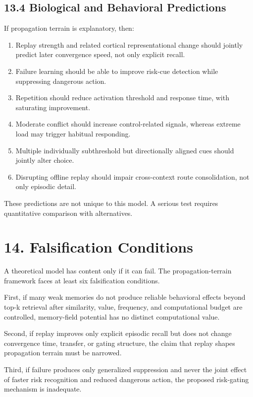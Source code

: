 \documentclass[11pt, a4paper]{article}
\begin{document}
\subsection{13.4 Biological and Behavioral Predictions}

If propagation terrain is explanatory, then:

\begin{enumerate}
\item Replay strength and related cortical representational change should jointly predict later convergence speed, not only explicit recall.
\item Failure learning should be able to improve risk-cue detection while suppressing dangerous action.
\item Repetition should reduce activation threshold and response time, with saturating improvement.
\item Moderate conflict should increase control-related signals, whereas extreme load may trigger habitual responding.
\item Multiple individually subthreshold but directionally aligned cues should jointly alter choice.
\item Disrupting offline replay should impair cross-context route consolidation, not only episodic detail.

\end{enumerate}
These predictions are not unique to this model. A serious test requires quantitative comparison with alternatives.


\section{14. Falsification Conditions}

A theoretical model has content only if it can fail. The propagation-terrain framework faces at least six falsification conditions.

First, if many weak memories do not produce reliable behavioral effects beyond top-k retrieval after similarity, value, frequency, and computational budget are controlled, memory-field potential has no distinct computational value.

Second, if replay improves only explicit episodic recall but does not change convergence time, transfer, or gating structure, the claim that replay shapes propagation terrain must be narrowed.

Third, if failure produces only generalized suppression and never the joint effect of faster risk recognition and reduced dangerous action, the proposed risk-gating mechanism is inadequate.
\end{document}
